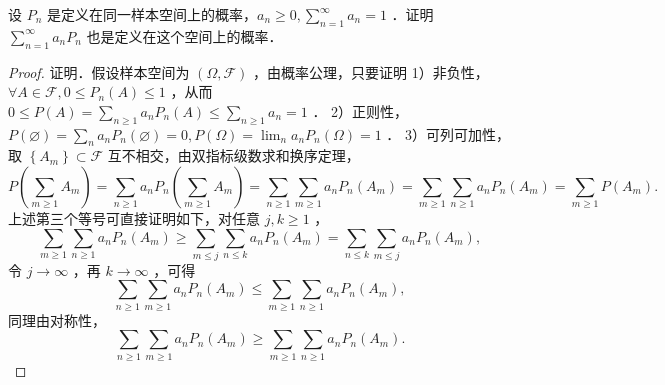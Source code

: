 \begin{exercise}
    设 $P_n$ 是定义在同一样本空间上的概率，$a_n \geq 0, \sum_{n=1}^{\infty} a_n=1$ ．证明 $\sum_{n=1}^{\infty} a_n P_n$ 也是定义在这个空间上的概率．
\end{exercise}
\begin{proof}
    证明．假设样本空间为 $(\Omega, \mathscr{F})$ ，由概率公理，只要证明
    1）非负性，$\forall A \in \mathscr{F}, 0 \leq P_n(A) \leq 1$ ，从而 $0 \leq P(A)=\sum_{n \geq 1} a_n P_n(A) \leq \sum_{n \geq 1} a_n=1$ ．
    2）正则性，$P(\varnothing)=\sum_n a_n P_n(\varnothing)=0, P(\Omega)=\lim _n a_n P_n(\Omega)=1$ ．
    3）可列可加性，取 $\left\{A_m\right\} \subset \mathscr{F}$ 互不相交，由双指标级数求和换序定理，
    $$
        P\left(\sum_{m \geq 1} A_m\right)=\sum_{n \geq 1} a_n P_n\left(\sum_{m \geq 1} A_m\right)=\sum_{n \geq 1} \sum_{m \geq 1} a_n P_n\left(A_m\right)=\sum_{m \geq 1} \sum_{n \geq 1} a_n P_n\left(A_m\right)=\sum_{m \geq 1} P\left(A_m\right) .
    $$
    上述第三个等号可直接证明如下，对任意 $j, k \geq 1$ ，
    $$
        \sum_{m \geq 1} \sum_{n \geq 1} a_n P_n\left(A_m\right) \geq \sum_{m \leq j} \sum_{n \leq k} a_n P_n\left(A_m\right)=\sum_{n \leq k} \sum_{m \leq j} a_n P_n\left(A_m\right),
    $$
    令 $j \rightarrow \infty$ ，再 $k \rightarrow \infty$ ，可得
    $$
        \sum_{n \geq 1} \sum_{m \geq 1} a_n P_n\left(A_m\right) \leq \sum_{m \geq 1} \sum_{n \geq 1} a_n P_n\left(A_m\right),
    $$
    同理由对称性，
    $$
        \sum_{n \geq 1} \sum_{m \geq 1} a_n P_n\left(A_m\right) \geq \sum_{m \geq 1} \sum_{n \geq 1} a_n P_n\left(A_m\right) .
    $$
\end{proof}

